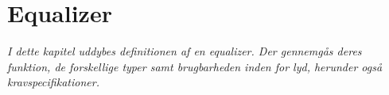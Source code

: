 \chapter{Equalizer}\label{kap:equalizer}
\vspace*{0.5 cm}
\emph{I dette kapitel uddybes definitionen af en equalizer. Der gennemgås deres funktion, de forskellige typer samt brugbarheden inden for lyd, herunder også kravspecifikationer.}